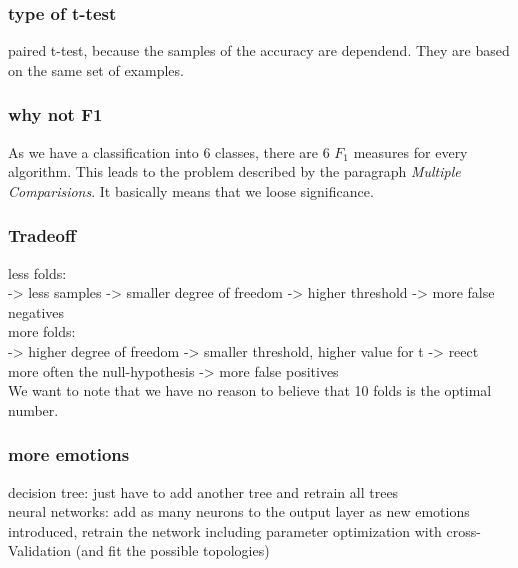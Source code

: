 \documentclass{article}
\begin{document}
\subsubsection{type of t-test}
paired t-test, because the samples of the accuracy are dependend. They are based on the same set of examples.
\subsubsection{why not F1}
As we have a classification into 6 classes, there are 6 $F_1$ measures for every algorithm. This leads to the problem described by the paragraph \emph{Multiple Comparisions}. It basically means that we loose significance.

\subsubsection{Tradeoff}
less folds:\\
-> less samples -> smaller degree of freedom -> higher threshold -> more false negatives
\\

more folds:\\
-> higher degree of freedom -> smaller threshold, higher value for t -> reect more often the null-hypothesis -> more false positives
\\
We want to note that we have no reason to believe that 10 folds is the optimal number.


\subsubsection{more emotions}
decision tree: just have to add another tree and retrain all trees\\

neural networks: add as many neurons to the output layer as new emotions introduced, retrain the network including parameter optimization with cross-Validation (and fit the possible topologies)
\end{document}
